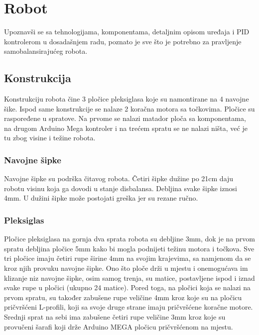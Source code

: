 \documentclass[../Document.tex]{subfiles}
\begin{document}
\section{Robot}
Upoznavši se sa tehnologijama, komponentama, detaljnim opisom uređaja i PID kontrolerom u dosadašnjem radu, poznato je sve što je potrebno za pravljenje samobalansirajućeg robota.

\subsection{Konstrukcija}
Konstrukciju robota čine 3 pločice pleksiglasa koje su namontirane na 4 navojne šike. Ispod same konstrukcije se nalaze 2 koračna motora sa točkovima. Pločice su raspoređene u spratove. Na prvome se nalazi matador ploča sa komponentama, na drugom Arduino Mega kontroler i na trećem spratu se ne nalazi ništa, već je tu zbog visine i težine robota.

\subsubsection{Navojne šipke}
Navojne šipke su podrška čitavog robota. Četiri šipke dužine po 21cm daju robotu visinu koja ga dovodi u stanje disbalansa. Debljina svake šipke iznosi 4mm. U dužini šipke može postojati greška jer su rezane ručno.


\subsubsection{Pleksiglas}
Pločice pleksiglasa na gornja dva sprata robota su debljine 3mm, dok je na prvom spratu debljina pločice 5mm kako bi mogla podnijeti težinu motora i točkova. Sve tri pločice imaju četiri rupe širine 4mm na svojim krajevima, sa namjenom da se kroz njih provuku navojne šipke. Ono što ploče drži u mjestu i onemogućava im klizanje niz navojne šipke, osim samog trenja, su matice, postavljene ispod i iznad svake rupe u pločici (ukupno 24 matice). Pored toga, na pločici koja se nalazi na prvom spratu, su također zabušene rupe veličine 4mm kroz koje su na pločicu pričvršćeni L-profili, koji sa svoje druge strane imaju pričvršćene koračne motore. Srednji sprat na sebi ima zabušene četiri rupe veličine 3mm kroz koje su provučeni šarafi koji drže Arduino MEGA pločicu pričvršćenom na mjestu.

\end{document}
